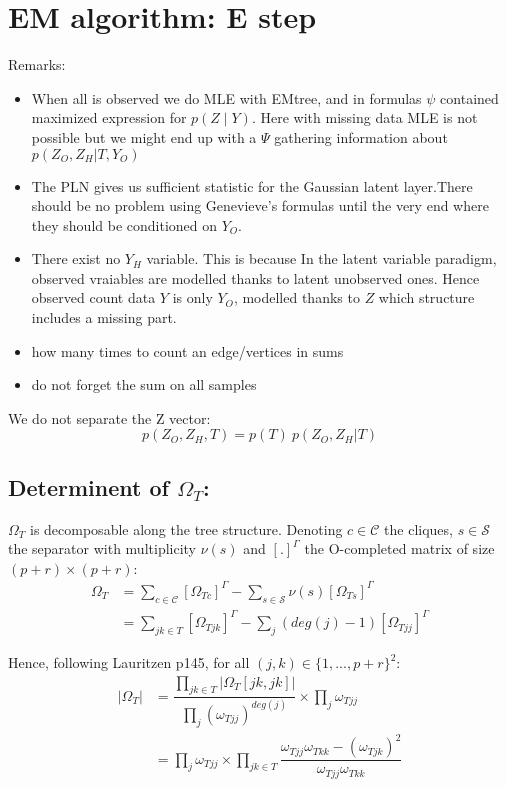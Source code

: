 \documentclass[11pt,a4paper]{article}
\begin{document}
\section{EM algorithm: E step}

Remarks:
\begin{itemize}
\item When all is observed we do MLE with EMtree, and in formulas $\psi$ contained maximized expression for $p(Z \mid Y)$. Here with missing data MLE is not possible but we might end up with a $\Psi$ gathering information about $ p(Z_O,Z_H|T,Y_O)$
\item The PLN gives us sufficient statistic for the Gaussian latent layer.There should be no problem using Genevieve's formulas until the very end where they should be conditioned on $Y_O$.
\item There exist no $Y_H$ variable. This is because In the latent variable paradigm, observed vraiables are modelled thanks to latent unobserved ones. Hence observed count data $Y$ is only $Y_O$, modelled thanks to $Z$ which structure includes a  missing part.
\item how many times to count an edge/vertices in sums 
\item do not forget the sum on all samples
\end{itemize}



We do not separate the Z vector:
$$p(Z_O,Z_H,T) = p(T) \: p(Z_O,Z_H|T)$$


\subsection{Determinent of $\Omega_T$:\\}
$\Omega_T$ is decomposable along the tree structure. Denoting $c\in\mathcal{C}$ the cliques, $s\in \mathcal{S}$ the separator with multiplicity $\nu(s)$ and $[.]^\Gamma$ the O-completed matrix of size $(p+r)\times(p+r)$:
\begin{align*}
\Omega_T &= \sum_{c\in \mathcal{C}} [\Omega_{Tc}]^\Gamma - \sum_{s \in\mathcal{S}} \nu(s)[\Omega_{Ts}]^\Gamma\\
&= \sum_{jk \in T} [\Omega_{Tjk}]^\Gamma - \sum_j (deg(j)-1)[\Omega_{Tjj}]^\Gamma
\end{align*}

Hence, following Lauritzen p145, for all $(j,k) \in \{1,...,p+r\}^2$:
\begin{align*}
|\Omega_T| &= \dfrac{\prod_{jk \in T} |\Omega_T[jk,jk]|}{\prod_j (\omega_{Tjj})^{deg(j)}} \times \prod_j \omega_{Tjj}\\
&=\prod_j \omega_{Tjj} \times \prod_{jk \in T} \dfrac{\omega_{Tjj}\omega_{Tkk}-(\omega_{Tjk})^2}{\omega_{Tjj}\omega_{Tkk}}
\end{align*}
\end{document}
